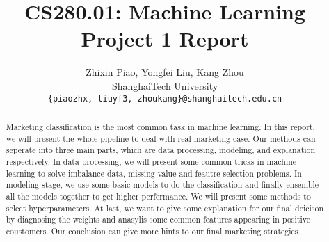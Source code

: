 \documentclass[10pt,twocolumn,letterpaper]{article}
\begin{document}
\title{CS280.01: Machine Learning\\ Project 1 Report}

\author{Zhixin Piao, Yongfei Liu, Kang Zhou\\
ShanghaiTech University\\
{\tt\small { \{piaozhx, liuyf3, zhoukang\}@shanghaitech.edu.cn}
}}



\maketitle

\begin{abstract}
   Marketing classification is the most common task in machine learning. In this report, we will present the whole pipeline to deal with real marketing case. Our methods can seperate into three main parts, which are data processing, modeling, and explanation respectively. In data processing, we will present some common tricks in machine learning to solve imbalance data, missing value and feautre selection problems. In modeling stage, we use some basic models to do the classification and finally ensemble all the models together to get higher perfermance. We will present some methods to select hyperparameters. At last, we want to give some explanation for our final deicison by diagnosing the weights and anasylis some common features appearing in positive coustomers. Our conclusion can give more hints to our final marketing strategies.
\end{abstract}








{\small


}
\end{document}
